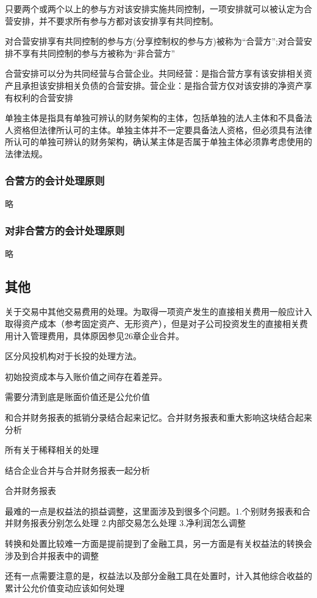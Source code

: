 \documentclass[UTF8,12pt]{ctexart}
\numberwithin{equation}{section} %
\numberwithin{figure}{section}
\numberwithin{table}{section}
\begin{document}
	只要两个或两个以上的参与方对该安排实施共同控制，一项安排就可以被认定为合营安排，并不要求所有参与方都对该安排享有共同控制。
	
	对合营安排享有共同控制的参与方(分享控制权的参与方)被称为“合营方”;对合营安排不享有共同控制的参与方被称为“非合营方”
	
	合营安排可以分为共同经营与合营企业。共同经营：是指合营方享有该安排相关资产且承担该安排相关负债的合营安排。营企业：是指合营方仅对该安排的净资产享有权利的合营安排
	
	单独主体是指具有单独可辨认的财务架构的主体，包括单独的法人主体和不具备法人资格但法律所认可的主体。单独主体并不一定要具备法人资格，但必须具有法律所认可的单独可辨认的财务架构，确认某主体是否属于单独主体必须靠考虑使用的法律法规。
	
	
	\subsubsection{合营方的会计处理原则}
	略
	
	\subsubsection{对非合营方的会计处理原则}
	略
	
	\subsection{其他}
	关于交易中其他交易费用的处理。为取得一项资产发生的直接相关费用一般应计入取得资产成本（参考固定资产、无形资产），但是对子公司投资发生的直接相关费用计入管理费用，具体原因参见26章企业合并。
	
	区分风投机构对于长投的处理方法。
	
	初始投资成本与入账价值之间存在着差异。
	
	需要分清到底是账面价值还是公允价值
	
	和合并财务报表的抵销分录结合起来记忆。合并财务报表和重大影响这块结合起来分析
	
	所有关于稀释相关的处理
	
	结合企业合并与合并财务报表一起分析
	
	合并财务报表
	
	最难的一点是权益法的损益调整，这里面涉及到很多个问题。1.个别财务报表和合并财务报表分别怎么处理 2.内部交易怎么处理 3.净利润怎么调整
	
	转换和处置比较难一方面是提前提到了金融工具，另一方面是有关权益法的转换会涉及到合并报表中的调整
	
	还有一点需要注意的是，权益法以及部分金融工具在处置时，计入其他综合收益的累计公允价值变动应该如何处理
	
\end{document}
